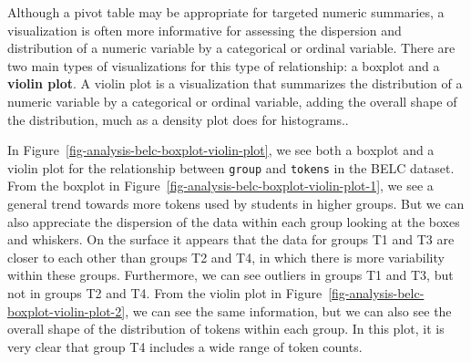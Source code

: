 \documentclass[
  letterpaper,
  krantz1]{latex/krantz-mod}
\theoremstyle{definition}
\theoremstyle{definition}
\theoremstyle{remark}
\begin{document}
Although a pivot table may be appropriate for targeted numeric
summaries, a visualization is often more informative for assessing the
dispersion and distribution of a
numeric variable by a categorical or ordinal variable. There are two
main types of visualizations for this type of relationship: a
boxplot and a \textbf{violin plot}. A
violin plot is a visualization that summarizes the distribution of a
numeric variable by a categorical or ordinal variable, adding the
overall shape of the distribution, much as a density
plot does for histograms..

In Figure~\ref{fig-analysis-belc-boxplot-violin-plot}, we see both a
boxplot and a violin plot for the relationship between \texttt{group}
and \texttt{tokens} in the BELC dataset. From the boxplot in
Figure~\ref{fig-analysis-belc-boxplot-violin-plot-1}, we see a general
trend towards more tokens used by students in higher groups. But we can
also appreciate the dispersion of the data within each
group looking at the boxes and whiskers. On the surface it appears that
the data for groups T1 and T3 are closer to each other than groups T2
and T4, in which there is more variability within these groups.
Furthermore, we can see outliers in groups T1 and T3,
but not in groups T2 and T4. From the violin plot in
Figure~\ref{fig-analysis-belc-boxplot-violin-plot-2}, we can see the
same information, but we can also see the overall shape of the
distribution of tokens within each group. In this plot, it is very clear
that group T4 includes a wide range of token counts.
\end{document}
